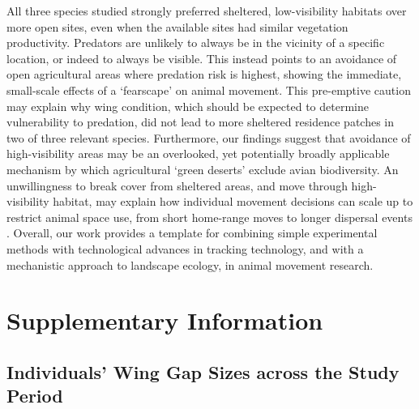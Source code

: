 All three species studied strongly preferred sheltered, low-visibility habitats over more open sites, even when the available sites had similar vegetation productivity.
Predators are unlikely to always be in the vicinity of a specific location, or indeed to always be visible.
This instead points to an avoidance of open agricultural areas where predation risk is highest, showing the immediate, small-scale effects of a `fearscape' \parencite{olsoy2015} on animal movement.
This pre-emptive caution may explain why wing condition, which should be expected to determine vulnerability to predation, did not lead to more sheltered residence patches in two of three relevant species.
Furthermore, our findings suggest that avoidance of high-visibility areas may be an overlooked, yet potentially broadly applicable mechanism by which agricultural `green deserts' exclude avian biodiversity.
An unwillingness to break cover from sheltered areas, and move through high-visibility habitat, may explain how individual movement decisions can scale up to restrict animal space use, from short home-range moves to longer dispersal events \parencite{schlagel2020a}.
Overall, our work provides a template for combining simple experimental methods with technological advances in tracking technology, and with a mechanistic approach to landscape ecology, in animal movement research.

{ \begin{center}  \end{center} }

\newpage


\begingroup

\let\clearpage\relax
\let\cleardoublepage\relax
\let\cleardoublepage\relax

{\chapter*{Supplementary Information}}

\section*{Individuals' Wing Gap Sizes across the Study Period}

